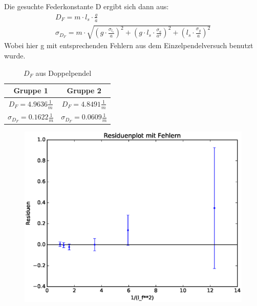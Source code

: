 \documentclass[12pt,a4paper]{article}
\begin{document}
Die gesuchte Federkonstante D ergibt sich dann aus:
\begin{align}
D_F=m \cdot l_s \cdot \frac{g}{a}\\
\sigma_{D_F}=m \cdot \sqrt{(g\cdot \frac{\sigma_{l_s}}{a})^2+(g\cdot l_s \cdot \frac{\sigma_a}{a^2})^2+(l_s \cdot \frac{\sigma_g}{a})^2}
\end{align}
Wobei hier g mit entsprechenden Fehlern aus dem Einzelpendelversuch benutzt wurde.
\begin{table}[H]\centering
\caption{$D_F$ aus Doppelpendel}
\begin{tabular}{c|c}
Gruppe 1 & Gruppe 2\\ 
\hline
$D_F=4.9636\frac{1}{m}$& $D_F=4.8491 \frac{1}{m}$\\ 
$\sigma_{D_F}=0.1622 \frac{1}{m}$& $\sigma_{D_F}=0.0609 \frac{1}{m}$\\
\end{tabular} 
\end{table}
\begin{figure}[H]
\caption{}
\centering
\includegraphics[scale=0.8]{Bilder/Bestimmung_D_Residuen.eps}
\end{figure}
\end{document}
